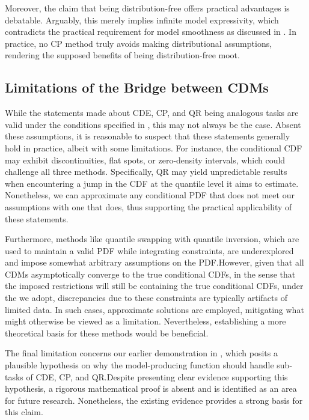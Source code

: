Moreover, the claim that being distribution-free offers practical advantages is debatable. Arguably, this merely implies infinite model expressivity, which contradicts the practical requirement for model smoothness as discussed in . In practice, no CP method truly avoids making distributional assumptions, rendering the supposed benefits of being distribution-free moot.

\subsection{Limitations of the Bridge between CDMs}

While the statements made about CDE, CP, and QR being analogous tasks are valid under the conditions specified in , this may not always be the case. Absent these assumptions, it is reasonable to suspect that these statements generally hold in practice, albeit with some limitations. For instance, the conditional CDF may exhibit discontinuities, flat spots, or zero-density intervals, which could challenge all three methods. Specifically, QR may yield unpredictable results when encountering a jump in the CDF at the quantile level it aims to estimate. Nonetheless, we can approximate any conditional PDF that does not meet our assumptions with one that does, thus supporting the practical applicability of these statements.

Furthermore, methods like quantile swapping with quantile inversion, which are used to maintain a valid PDF while integrating constraints, are underexplored and impose somewhat arbitrary assumptions on the PDF.\@ However, given that all CDMs asymptotically converge to the true conditional CDFs, in the sense that the imposed restrictions will still be containing the true conditional CDFs, under the  we adopt, discrepancies due to these constraints are typically artifacts of limited data. In such cases, approximate solutions are employed, mitigating what might otherwise be viewed as a limitation. Nevertheless, establishing a more theoretical basis for these methods would be beneficial.

The final limitation concerns our earlier demonstration in , which posits a plausible hypothesis on why the model-producing function should handle sub-tasks of CDE, CP, and QR.\@ Despite presenting clear evidence supporting this hypothesis, a rigorous mathematical proof is absent and is identified as an area for future research. Nonetheless, the existing evidence provides a strong basis for this claim.

